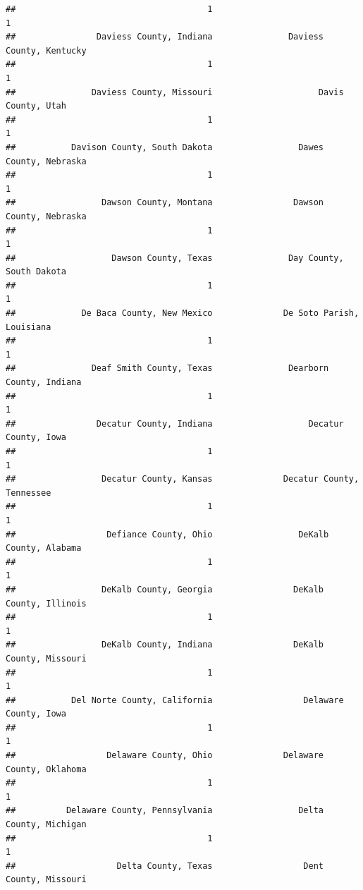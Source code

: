 \documentclass[
]{article}
\begin{document}
\begin{verbatim}
##                                      1                                      1 
##                Daviess County, Indiana               Daviess County, Kentucky 
##                                      1                                      1 
##               Daviess County, Missouri                     Davis County, Utah 
##                                      1                                      1 
##           Davison County, South Dakota                 Dawes County, Nebraska 
##                                      1                                      1 
##                 Dawson County, Montana                Dawson County, Nebraska 
##                                      1                                      1 
##                   Dawson County, Texas               Day County, South Dakota 
##                                      1                                      1 
##             De Baca County, New Mexico              De Soto Parish, Louisiana 
##                                      1                                      1 
##               Deaf Smith County, Texas               Dearborn County, Indiana 
##                                      1                                      1 
##                Decatur County, Indiana                   Decatur County, Iowa 
##                                      1                                      1 
##                 Decatur County, Kansas              Decatur County, Tennessee 
##                                      1                                      1 
##                  Defiance County, Ohio                 DeKalb County, Alabama 
##                                      1                                      1 
##                 DeKalb County, Georgia                DeKalb County, Illinois 
##                                      1                                      1 
##                 DeKalb County, Indiana                DeKalb County, Missouri 
##                                      1                                      1 
##           Del Norte County, California                  Delaware County, Iowa 
##                                      1                                      1 
##                  Delaware County, Ohio              Delaware County, Oklahoma 
##                                      1                                      1 
##          Delaware County, Pennsylvania                 Delta County, Michigan 
##                                      1                                      1 
##                    Delta County, Texas                  Dent County, Missouri 

\end{verbatim}
\end{document}
